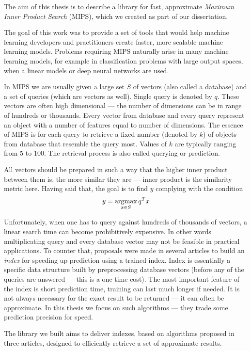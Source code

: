 The aim of this thesis is to describe a library for fast, approximate \textit{Maximum Inner Product Search} (MIPS),
which we created as part of our dissertation. 

The goal of this work was to provide a set of tools that would help machine learning developers and practitioners create faster, 
more scalable machine learning models.
Problems requiring MIPS naturally arise in many machine learning models, for example in
classification problems with large output spaces, when a linear models or deep neural networks are used.

In MIPS we are usually given a large set $S$ of vectors (also called a database) and a set of queries
(which are vectors as well). Single query is denoted by $q$.
These vectors are often high dimensional --- the number of dimensions can be in range of hundreds or thousands.
Every vector from database and every query represent an object with a number of features equal to number of dimensions.
The essence of MIPS is for each query to retrieve a fixed number (denoted by $k$)
of objects from database that resemble the query most.
Values of $k$ are typically ranging from $5$ to $100$.
The retrieval process is also called querying or prediction.

All vectors should be prepared in such a way that the higher inner product between them is, the more similar they are
 --- inner product is the similarity metric here. Having said that, the goal is to find $y$ complying with the condition
\[ y = \operatorname*{argmax}_{x \in S} q^T x \]

Unfortunately, when one has to query against hundreds of thousands of vectors,
a linear search time can become prohibitively expensive.
In other words multiplicating query and every database vector may not be feasible in practical applications.
To counter that, proposals were made in several articles to build an \textit{index} for speeding
up prediction using a trained index.
Index is essentially a specific data structure built by preprocessing database vectors (before
any of the queries are answered --- this is a one-time cost).
The most important feature of the index is short prediction time, training can last much longer if needed.
It is not always necessary for the exact result to be returned --- it can often be approximate.
In this thesis we focus on such algorithms --- they trade some prediction precision for speed.

The library we built aims to deliver indexes, based on algorithms proposed in three articles,
designed to efficiently retrieve a set of approximate results.

